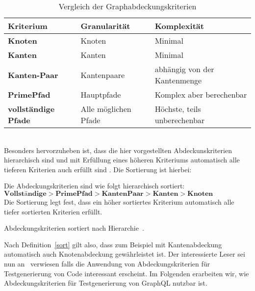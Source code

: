 \begin{center}
    \begin{table}[!ht]
        \begin{tabularx}{\textwidth}{|C|C|C|}
            \hline
            \textbf{Kriterium} & \textbf{Granularität} & \textbf{Komplexität} \\
            \hline
            \textbf{Knoten} & Knoten & Minimal \\
            \hline
            \textbf{Kanten} & Kanten & Minimal \\
            \hline
            \textbf{Kanten-Paar} & Kantenpaare & abhängig von der Kantenmenge \\
            \hline
            \textbf{PrimePfad} & Hauptpfade & Komplex aber berechenbar \\
            \hline
            \textbf{vollständige Pfade} & Alle möglichen Pfade & Höchste, teils unberechenbar \\
            \hline
        \end{tabularx}
        \caption{Vergleich der Graphabdeckungskriterien}
    \end{table}
\end{center}
\\

Besonders hervorzuheben ist, dass die hier vorgestellten Abdeckunskriterien hierarchisch sind und mit Erfüllung eines höheren Kriteriums automatisch alle tieferen Kriterien auch erfüllt sind \cite[vgl. Figure 2.15]{software-testing}.
Die Sortierung ist hierbei: \\
\begin{definition}
    Die Abdeckungskriterien sind wie folgt hierarchisch sortiert: \\
    $ \textbf{Vollständige} > \textbf{PrimePfad} > \textbf{KantenPaar} > \textbf{Kanten} > \textbf{Knoten} $ \\
    Die Sortierung legt fest, dass ein höher sortiertes Kriterium automatisch alle tiefer sortierten Kriterien erfüllt.
    \caption{Abdeckungskriterien sortiert nach Hierarchie~\cite[vgl. Figure 2.15]{software-testing}.}
    \label{sort}
\end{definition}

Nach Definition~\ref{sort} gilt also, dass zum Beispiel mit Kantenabdeckung automatisch auch Knotenabdeckung gewährleistet ist.
Der interessierte Leser sei nun an~\cite{software-testing} verwiesen falls die Anwendung von Abdeckungskriterien für Testgenerierung von Code interessant erscheint.
Im Folgenden erarbeiten wir, wie Abdeckungskriterien für Testgenerierung von GraphQL nutzbar ist.